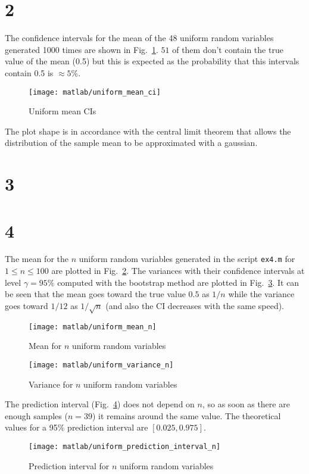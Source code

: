 \documentclass{article}
\newcommand{\inlinecode}[1]{\lstinline[basicstyle=\ttfamily,keywordstyle={}]{#1}}
\begin{document}
    \section*{2}
    The confidence intervals for the mean of the 48 uniform random
  variables generated 1000 times are shown in
  Fig.~\ref{uniform_mean_ci}. $51$ of them don't contain the true
  value of the mean (0.5) but this is expected as the probability that
  this intervals contain 0.5 is $\approx 5\%$.
  \begin{figure}[htbp]
    \centering
    \texttt{[image: matlab/uniform\_mean\_ci]}
    \caption{Uniform mean CIs}
    \label{uniform_mean_ci}
  \end{figure}
  The plot shape is in accordance with the central limit theorem that
  allows the distribution of the sample mean to be approximated with a
  gaussian.
\section*{3}
\section*{4} The mean for the $n$ uniform random variables generated in the
  script \inlinecode{ex4.m} for $ 1 \leq n \leq 100 $ are plotted in
  Fig.~\ref{uniform_mean}. The variances with their confidence
  intervals at level $\gamma = 95\%$ computed with the bootstrap
  method are plotted in Fig.~\ref{uniform_var}. It can be seen that
  the mean goes toward the true value $0.5$ as $1/n$ while the
  variance goes toward $1/12$ as $1/\sqrt{n}$ (and also the CI
  decreases with the same speed).
  \begin{figure}[htbp]
    \centering
    \texttt{[image: matlab/uniform\_mean\_n]}
    \caption{Mean for $n$ uniform random variables}
    \label{uniform_mean}
  \end{figure}
  \begin{figure}[htbp]
    \centering
    \texttt{[image: matlab/uniform\_variance\_n]}
    \caption{Variance for $n$ uniform random variables}
    \label{uniform_var}
  \end{figure}
  The prediction interval (Fig.~\ref{pred_int_unif}) does not depend
  on $n$, so as soon as there are enough samples ($n=39$) it remains
  around the same value. The theoretical values for a 95\% prediction
  interval are $[0.025, 0.975]$.
  \begin{figure}[htbp]
    \centering
    \texttt{[image: matlab/uniform\_prediction\_interval\_n]}
    \caption{Prediction interval for $n$ uniform random variables}
    \label{pred_int_unif}
  \end{figure}
\end{document}
